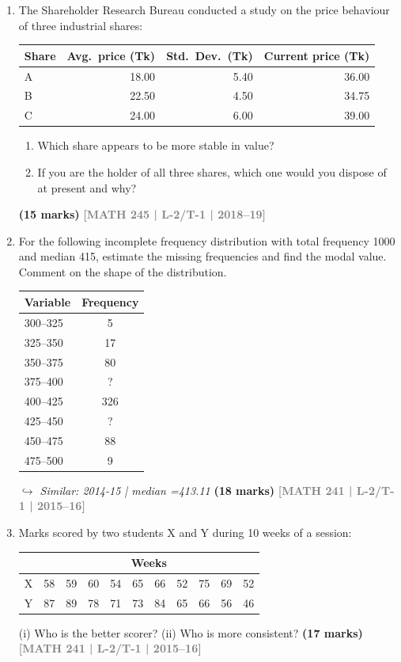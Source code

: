 \documentclass[12pt,a4paper]{article}
\newcommand{\yr}[1]{\hfill\textcolor{gray}{\small\textbf{[#1]}}}
\newcommand{\mk}[1]{\textcolor{orange!70!black}{\small\textbf{(#1 marks)}}}
\newcommand{\variant}[1]{\par\vspace{1pt}\textcolor{blue!50!black}%
  {\footnotesize\itshape$\hookrightarrow$ Similar: #1}}
\begin{document}
\begin{enumerate}
\item The Shareholder Research Bureau conducted a study on the price behaviour of three industrial shares:
\begin{center}
\begin{tabular}{lrrr}
\toprule
\textbf{Share} & \textbf{Avg.\ price (Tk)} & \textbf{Std.\ Dev.\ (Tk)} & \textbf{Current price (Tk)} \\
\midrule
A & 18.00 & 5.40 & 36.00 \\
B & 22.50 & 4.50 & 34.75 \\
C & 24.00 & 6.00 & 39.00 \\
\bottomrule
\end{tabular}
\end{center}
\begin{enumerate}
  \item Which share appears to be more stable in value?
  \item If you are the holder of all three shares, which one would you dispose of at present and why?
\end{enumerate}
\mk{15} \yr{MATH 245 | L-2/T-1 | 2018--19}

\item For the following incomplete frequency distribution with total frequency 1000 and median 415, estimate the missing frequencies and find the modal value. Comment on the shape of the distribution.
\begin{center}
\begin{tabular}{lc}
\toprule
\textbf{Variable} & \textbf{Frequency} \\
\midrule
300--325 & 5 \\ 325--350 & 17 \\ 350--375 & 80 \\ 375--400 & ? \\ 400--425 & 326 \\ 425--450 & ? \\ 450--475 & 88 \\ 475--500 & 9 \\
\bottomrule
\end{tabular}
\end{center}
\variant{2014-15 | median =413.11}
\mk{18} \yr{MATH 241 | L-2/T-1 | 2015--16}

\item Marks scored by two students X and Y during 10 weeks of a session:
\begin{center}
\begin{tabular}{lrrrrrrrrrr}
\toprule
 & \multicolumn{10}{c}{\textbf{Weeks}} \\
\midrule
X & 58 & 59 & 60 & 54 & 65 & 66 & 52 & 75 & 69 & 52 \\
Y & 87 & 89 & 78 & 71 & 73 & 84 & 65 & 66 & 56 & 46 \\
\bottomrule
\end{tabular}
\end{center}
(i) Who is the better scorer? (ii) Who is more consistent?
\mk{17} \yr{MATH 241 | L-2/T-1 | 2015--16}


\end{enumerate}
\end{document}
